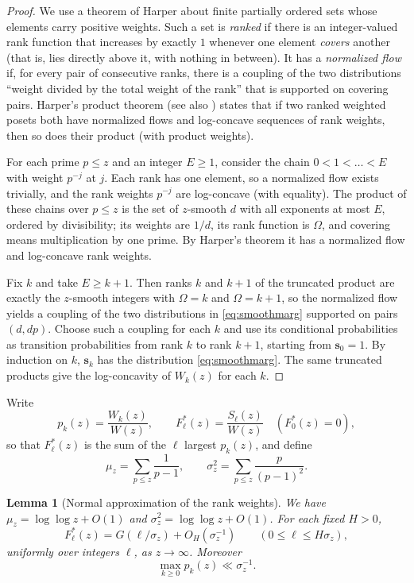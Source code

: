\documentclass[11pt,a4paper]{article}
\numberwithin{equation}{section}
\theoremstyle{plain}
\newtheorem{lemma}[theorem]{Lemma}
\theoremstyle{definition}
\theoremstyle{remark}
\newcommand{\bs}{\mathbf{s}}
\begin{document}
\begin{proof}
We use a theorem of Harper about finite partially ordered sets whose elements carry positive weights. Such a set is \emph{ranked} if there is an integer-valued rank function that increases by exactly $1$ whenever one element \emph{covers} another (that is, lies directly above it, with nothing in between). It has a \emph{normalized flow} if, for every pair of consecutive ranks, there is a coupling of the two distributions ``weight divided by the total weight of the rank'' that is supported on covering pairs. Harper's product theorem \cite[Theorem~I.C]{Harper} (see also \cite[Theorem~2.5]{GaetzGao}) states that if two ranked weighted posets both have normalized flows and log-concave sequences of rank weights, then so does their product (with product weights).

For each prime $p\le z$ and an integer $E\ge1$, consider the chain $0<1<\dots<E$ with weight $p^{-j}$ at $j$. Each rank has one element, so a normalized flow exists trivially, and the rank weights $p^{-j}$ are log-concave (with equality). The product of these chains over $p\le z$ is the set of $z$-smooth $d$ with all exponents at most $E$, ordered by divisibility; its weights are $1/d$, its rank function is $\Omega$, and covering means multiplication by one prime. By Harper's theorem it has a normalized flow and log-concave rank weights.

Fix $k$ and take $E\ge k+1$. Then ranks $k$ and $k+1$ of the truncated product are exactly the $z$-smooth integers with $\Omega=k$ and $\Omega=k+1$, so the normalized flow yields a coupling of the two distributions in \eqref{eq:smoothmarg} supported on pairs $(d,dp)$. Choose such a coupling for each $k$ and use its conditional probabilities as transition probabilities from rank $k$ to rank $k+1$, starting from $\bs_0=1$. By induction on $k$, $\bs_k$ has the distribution \eqref{eq:smoothmarg}. The same truncated products give the log-concavity of $W_k(z)$ for each $k$.
\end{proof}

Write
\[
p_k(z)=\frac{W_k(z)}{W(z)},\qquad F^*_\ell(z)=\frac{S_\ell(z)}{W(z)}\quad(F^*_0(z)=0),
\]
so that $F^*_\ell(z)$ is the sum of the $\ell$ largest $p_k(z)$, and define
\[
\mu_z=\sum_{p\le z}\frac{1}{p-1},\qquad \sigma_z^2=\sum_{p\le z}\frac{p}{(p-1)^2}.
\]

\begin{lemma}[Normal approximation of the rank weights]\label{lem:normal}
We have $\mu_z=\log\log z+O(1)$ and $\sigma_z^2=\log\log z+O(1)$. For each fixed $H>0$,
\begin{equation}\label{eq:Fstar}
F^*_\ell(z)=G(\ell/\sigma_z)+O_H(\sigma_z^{-1})\qquad(0\le\ell\le H\sigma_z),
\end{equation}
uniformly over integers $\ell$, as $z\to\infty$. Moreover
\begin{equation}\label{eq:maxpk}
\max_{k\ge0}p_k(z)\ll\sigma_z^{-1}.
\end{equation}
\end{lemma}
\end{document}
